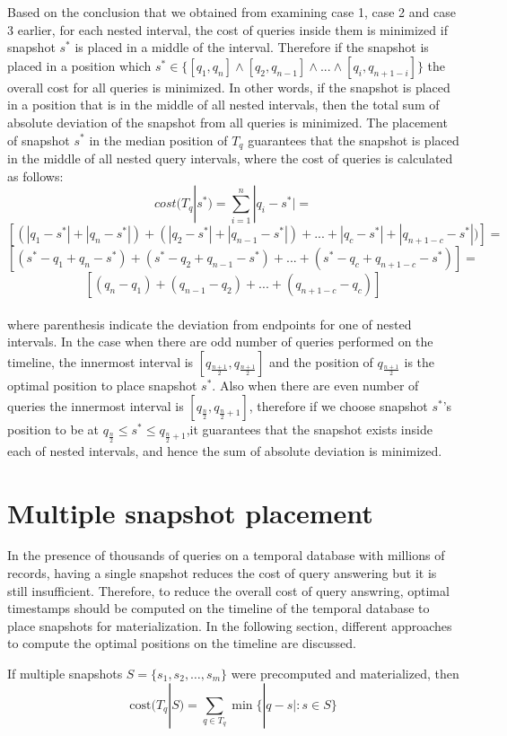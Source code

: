 			Based on the conclusion that we obtained from examining case 1, case 2 and case 3 earlier, for each nested interval, the cost of queries inside them is minimized if snapshot $s^*$ is placed in a middle of the interval. Therefore if the snapshot is placed in a position which $s^*\in \{ [q_1,q_n] \wedge [q_2,q_{n-1}] \wedge ... \wedge [q_i,q_{n+1-i}] \}$ the overall cost for all queries is minimized. In other words, if the snapshot is placed in a position that is in the middle of all nested intervals, then the total sum of absolute deviation of the snapshot from all queries is minimized. The placement of snapshot $s^*$ in the median position of $T_q$ guarantees that the snapshot is placed in the middle of all nested query intervals, where the cost of queries is calculated as follows:
			$$cost(T_q|s^*)=\sum_{i=1}^n |q_i-s^*| = $$
			$$[(|q_1-s^*|+|q_n-s^*|)+(|q_2-s^*|+|q_{n-1}-s^*|)+...+|q_c-s^*|+|q_{n+1-c}-s^*|)]=$$
			$$[(s^*-q_1+q_n-s^*)+(s^*-q_2+q_{n-1}-s^*)+...+(s^*-q_c+q_{n+1-c}-s^*)]=$$
			$$[(q_n-q_1)+(q_{n-1}-q_2)+...+(q_{n+1-c}-q_c)]$$\\
			where parenthesis indicate the deviation from endpoints for one of nested intervals. In the case when there are odd number of queries performed on the timeline, the innermost interval is $[q_{\frac{n+1}{2}},q_{\frac{n+1}{2}}]$ and the position of $q_{\frac{n+1}{2}}$ is the optimal position to place snapshot $s^*$. Also when there are even number of queries the innermost interval is $[q_{\frac{n}{2}},q_{\frac{n}{2}+1}]$, therefore if we choose snapshot $s^*$'s position to be at $q_{\frac{n}{2}}\leq s^*\leq q_{\frac{n}{2}+1}$,it guarantees that the snapshot exists inside each of nested intervals, and hence the sum of absolute deviation is minimized. 


	\section{Multiple snapshot placement} \label{sec:optimal_multiple_snapshot} \label{sec:optimal_multiple_snapshot}
		In the presence of thousands of queries on a temporal database with millions of records, having a single snapshot reduces the cost of query answering but it is still insufficient. Therefore, to reduce the overall cost of query answring, optimal timestamps should be computed on the timeline of the temporal database to place snapshots for materialization. In the following section, different approaches to compute the optimal positions on the timeline are discussed.

		\begin{prop}
			If multiple snapshots $S=\{s_1, s_2, \dots, s_m \}$ were precomputed and materialized, then 
			$$\mathrm{cost}(T_q|S) = \sum_{q\in T_q} \min\{|q-s| : s\in S\}$$
		\label{prop:cost_of_multiple_snapshots}
		\end{prop}


